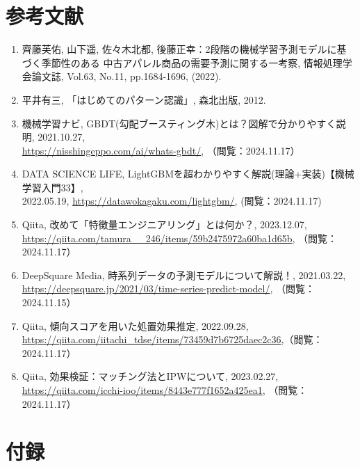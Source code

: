 \documentclass[dvipdfmx]{jreport}
\begin{document}
\section{参考文献}
\begin{enumerate}
    \renewcommand{\labelenumi}{[\theenumi]}
    \item 齊藤芙佑, 山下遥, 佐々木北都, 後藤正幸：2段階の機械学習予測モデルに基づく季節性のある 
    中古アパレル商品の需要予測に関する一考察, 情報処理学会論文誌, Vol.63, No.11, pp.1684-1696, (2022).
    \item 平井有三, 「はじめてのパターン認識」, 森北出版, 2012. \label{はじパタ}
    \item 機械学習ナビ, GBDT(勾配ブースティング木)とは？図解で分かりやすく説明, 2021.10.27, \\ \url{https://nisshingeppo.com/ai/whats-gbdt/}, （閲覧：2024.11.17）\label{gbdt}
    \item DATA SCIENCE LIFE, LightGBMを超わかりやすく解説(理論+実装)【機械学習入門33】, \\ 2022.05.19, \url{https://datawokagaku.com/lightgbm/}, (閲覧：2024.11.17) \label{lightgbm}
    \item Qiita, 改めて「特徴量エンジニアリング」とは何か？, 2023.12.07, \\ \url{https://qiita.com/tamura__246/items/59b2475972a60ba1d65b}, （閲覧：2024.11.17）\label{特徴量}
    \item DeepSquare Media, 時系列データの予測モデルについて解説！, 2021.03.22, \\ \url{https://deepsquare.jp/2021/03/time-series-predict-model/}, （閲覧：2024.11.15） \label{時系列}
    \item Qiita, 傾向スコアを用いた処置効果推定, 2022.09.28, \\ \url{https://qiita.com/iitachi_tdse/items/73459d7b6725daec2c36},（閲覧：2024.11.17）\label{処置群}
    \item Qiita, 効果検証：マッチング法とIPWについて, 2023.02.27, \\ \url{https://qiita.com/icchi-ioo/items/8443e777f1652a425ea1}, （閲覧：2024.11.17） \label{マッチング}
\end{enumerate}

\section{付録}
\end{document}
